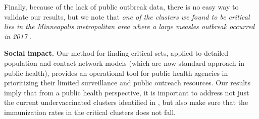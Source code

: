 Finally, because of the lack of public outbreak data, there is no easy way to validate our results, but we note that \emph{one of the clusters we found to be critical lies in the Minneapolis metropolitan area where a large measles outbreak occurred in 2017 \cite{hall:mmwr17}}.


\noindent
\textbf{Social impact.}
Our method for finding critical sets, applied to detailed population and contact network models (which are now standard approach in public health), provides an operational tool for public health agencies in prioritizing their limited surveillance and public outreach resources.
Our results imply that from a public health perspective, it is important to address not just the current undervaccinated clusters
identified in \cite{cadena:vacc-cluster}, but also make sure that the immunization rates in the critical clusters does not fall.






